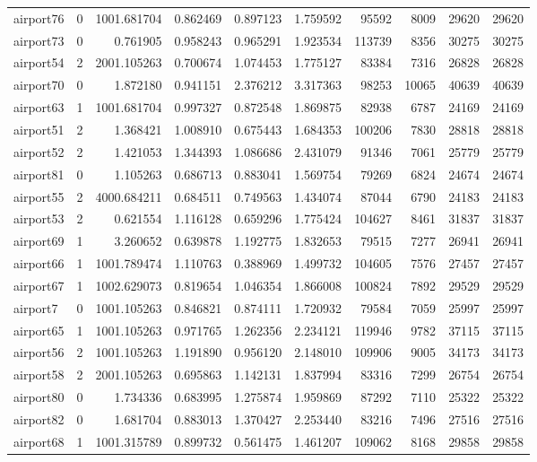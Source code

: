 \begin{longtable}{|l|r|r|r|r|r|r|r|r|r|}
airport76 & 0 & 1001.681704 & 0.862469 & 0.897123 & 1.759592 & 95592 & 8009 & 29620 & 29620 \\
airport73 & 0 & 0.761905 & 0.958243 & 0.965291 & 1.923534 & 113739 & 8356 & 30275 & 30275 \\
airport54 & 2 & 2001.105263 & 0.700674 & 1.074453 & 1.775127 & 83384 & 7316 & 26828 & 26828 \\
airport70 & 0 & 1.872180 & 0.941151 & 2.376212 & 3.317363 & 98253 & 10065 & 40639 & 40639 \\
airport63 & 1 & 1001.681704 & 0.997327 & 0.872548 & 1.869875 & 82938 & 6787 & 24169 & 24169 \\
airport51 & 2 & 1.368421 & 1.008910 & 0.675443 & 1.684353 & 100206 & 7830 & 28818 & 28818 \\
airport52 & 2 & 1.421053 & 1.344393 & 1.086686 & 2.431079 & 91346 & 7061 & 25779 & 25779 \\
airport81 & 0 & 1.105263 & 0.686713 & 0.883041 & 1.569754 & 79269 & 6824 & 24674 & 24674 \\
airport55 & 2 & 4000.684211 & 0.684511 & 0.749563 & 1.434074 & 87044 & 6790 & 24183 & 24183 \\
airport53 & 2 & 0.621554 & 1.116128 & 0.659296 & 1.775424 & 104627 & 8461 & 31837 & 31837 \\
airport69 & 1 & 3.260652 & 0.639878 & 1.192775 & 1.832653 & 79515 & 7277 & 26941 & 26941 \\
airport66 & 1 & 1001.789474 & 1.110763 & 0.388969 & 1.499732 & 104605 & 7576 & 27457 & 27457 \\
airport67 & 1 & 1002.629073 & 0.819654 & 1.046354 & 1.866008 & 100824 & 7892 & 29529 & 29529 \\
airport7 & 0 & 1001.105263 & 0.846821 & 0.874111 & 1.720932 & 79584 & 7059 & 25997 & 25997 \\
airport65 & 1 & 1001.105263 & 0.971765 & 1.262356 & 2.234121 & 119946 & 9782 & 37115 & 37115 \\
airport56 & 2 & 1001.105263 & 1.191890 & 0.956120 & 2.148010 & 109906 & 9005 & 34173 & 34173 \\
airport58 & 2 & 2001.105263 & 0.695863 & 1.142131 & 1.837994 & 83316 & 7299 & 26754 & 26754 \\
airport80 & 0 & 1.734336 & 0.683995 & 1.275874 & 1.959869 & 87292 & 7110 & 25322 & 25322 \\
airport82 & 0 & 1.681704 & 0.883013 & 1.370427 & 2.253440 & 83216 & 7496 & 27516 & 27516 \\
airport68 & 1 & 1001.315789 & 0.899732 & 0.561475 & 1.461207 & 109062 & 8168 & 29858 & 29858 \\

\end{longtable}
